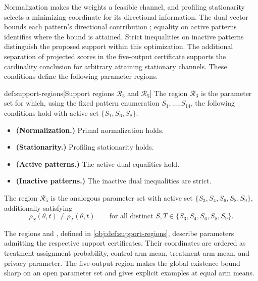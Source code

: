 \documentclass[11pt]{article}
\begin{document}
Normalization makes the weights a feasible channel, and profiling stationarity selects a minimizing coordinate for its directional information. The dual vector  bounds each pattern's directional contribution ; equality on active patterns identifies where the bound is attained. Strict inequalities on inactive patterns distinguish the proposed support within this optimization. The additional separation of projected scores in the five-output certificate supports the cardinality conclusion for arbitrary attaining stationary channels. These conditions define the following parameter regions.

\begin{definitionv}{def:support-regions}[Support regions $\mathcal R_3$ and $\mathcal R_5$]
The region \(\mathcal R_3\) is the parameter set for which, using the fixed pattern enumeration \(S_1,\ldots,S_{14}\), the following conditions hold with active set \(\{S_1,S_6,S_8\}\):
\begin{itemize}
\item \textbf{(Normalization.)} Primal normalization holds.
\item \textbf{(Stationarity.)} Profiling stationarity holds.
\item \textbf{(Active patterns.)} The active dual equalities hold.
\item \textbf{(Inactive patterns.)} The inactive dual inequalities are strict.
\end{itemize}
The region \(\mathcal R_5\) is the analogous parameter set with active set \(\{S_3,S_4,S_6,S_8,S_9\}\), additionally satisfying
\[
\rho_S(\theta,t)\ne\rho_T(\theta,t)
\qquad
\text{for all distinct }S,T\in\{S_3,S_4,S_6,S_8,S_9\}.
\]
\end{definitionv}

The regions  and , defined in \cref{obj:def:support-regions}, describe parameters admitting the respective support certificates. Their coordinates are ordered as treatment-assignment probability, control-arm mean, treatment-arm mean, and privacy parameter. The five-output region makes the global existence bound sharp on an open parameter set and gives explicit examples at equal arm means.
\end{document}

